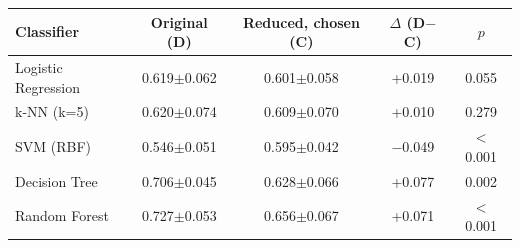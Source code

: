 \begin{tabular}{lcccc}
\hline
Classifier & Original (D) & Reduced, chosen (C) & $\Delta$ (D$-$C) & $p$ \\
\hline
Logistic Regression & 0.619$\pm$0.062 & 0.601$\pm$0.058 & +0.019 & 0.055 \\
k-NN (k=5) & 0.620$\pm$0.074 & 0.609$\pm$0.070 & +0.010 & 0.279 \\
SVM (RBF) & 0.546$\pm$0.051 & 0.595$\pm$0.042 & $-$0.049 & $<$0.001 \\
Decision Tree & 0.706$\pm$0.045 & 0.628$\pm$0.066 & +0.077 & 0.002 \\
Random Forest & 0.727$\pm$0.053 & 0.656$\pm$0.067 & +0.071 & $<$0.001 \\
\hline
\end{tabular}
